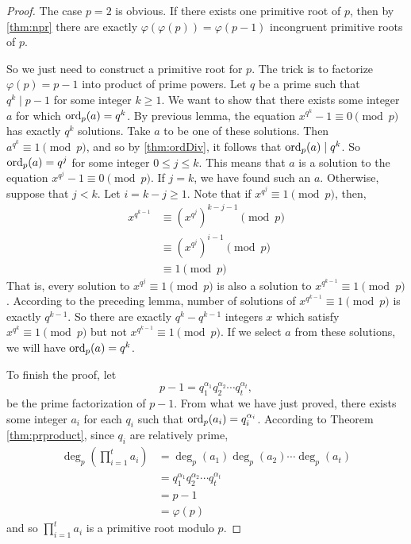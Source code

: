 \documentclass{subfile}
\begin{document}
	\begin{proof}
		The case $p=2$ is obvious. If there exists one primitive root of $p$, then by \autoref{thm:npr} there are exactly $\varphi(\varphi(p))=\varphi(p-1)$ incongruent primitive roots of $p$.

		So we just need to construct a primitive root for $p$. The trick is to factorize $\varphi(p)=p-1$ into product of prime powers. Let $q$ be a prime such that $q^k \mid p-1$ for some integer $k \geq 1$. We want to show that there exists some integer $a$ for which $\operatorname{ord}_p(a)=q^k$. By previous lemma, the equation $x^{q^k} - 1 \equiv 0 \pmod p$ has exactly $q^k$ solutions. Take $a$ to be one of these solutions. Then $a^{q^k} \equiv 1 \pmod p$, and so by \autoref{thm:ordDiv}, it follows that $\operatorname{ord}_p(a)\mid q^k$. So $\operatorname{ord}_p(a)=q^j$ for some integer $0 \leq j \leq k$. This means that $a$ is a solution to the equation $x^{q^j} - 1 \equiv 0 \pmod p$. If $j=k$, we have found such an $a$. Otherwise, suppose that $j<k$. Let $i=k-j\geq 1$. Note that if $x^{q^j} \equiv 1 \pmod p$, then,
			\begin{align*}
				x^{q^{k-1}}
					& \equiv \left(x^{q^j}\right)^{k-j-1}\pmod{p}\\
					& \equiv \left(x^{q^j}\right)^{i-1}\pmod{p}\\
					& \equiv 1 \pmod p
			\end{align*}
		That is, every solution to $x^{q^j} \equiv 1 \pmod p$ is also a solution to $x^{q^{k-1}} \equiv 1 \pmod p$. According to the preceding lemma, number of solutions of $x^{q^{k-1}} \equiv 1 \pmod p$ is exactly $q^{k-1}$. So there are exactly $q^k - q^{k-1}$ integers $x$ which satisfy $x^{q^k} \equiv 1 \pmod p$ but not $x^{q^{k-1}} \equiv 1 \pmod p$. If we select $a$ from these solutions, we will have $\operatorname{ord}_p(a)=q^k$.

		To finish the proof, let $$p-1 = q_1^{\alpha_1}q_2^{\alpha_2} \cdots q_t^{\alpha_t},$$ be the prime factorization of $p-1$. From what we have just proved, there exists some integer $a_i$ for each $q_i$ such that $\operatorname{ord}_p(a_i)=q_i^{\alpha_i}$. According to Theorem \eqref{thm:prproduct}, since $q_i$ are relatively prime,
			\begin{align*}
				\deg_p\left(\prod_{i=1}^{t}a_i\right)
					& = \deg_p(a_1) \deg_p(a_2) \cdots \deg_p(a_t)\\
					& = q_1^{\alpha_1}q_2^{\alpha_2} \cdots q_t^{\alpha_t}\\
					& = p-1\\
					& =\varphi(p)
			\end{align*}
		and so $\prod_{i=1}^{t}a_i$ is a primitive root modulo $p$.
	\end{proof}
\end{document}
